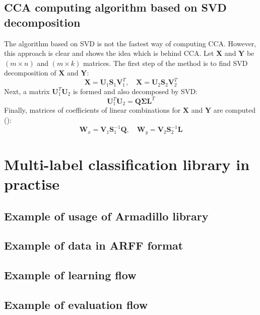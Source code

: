 \begin{appendices}
\newpage
\section{CCA computing algorithm based on SVD decomposition}
\label{app:cca}

The algorithm based on SVD is not the fastest way of computing CCA. However, this approach is clear and shows the idea which is behind CCA. Let $\boldsymbol{X}$ and $\boldsymbol{Y}$ be $(m \times n)$ and $(m \times k)$ matrices. The first step of the method is to find SVD decomposition of $\boldsymbol{X}$ and $\boldsymbol{Y}$:
\begin{equation}
    \boldsymbol{X}=\boldsymbol{U}_1\boldsymbol{S}_1\boldsymbol{V}^T_1, \quad \boldsymbol{X}=\boldsymbol{U}_2\boldsymbol{S}_2\boldsymbol{V}^T_2
\end{equation}
Next, a matrix $\boldsymbol{U}_1^T\boldsymbol{U}_2$ is formed and also decomposed by SVD:
\begin{equation}
    \boldsymbol{U}_1^T\boldsymbol{U}_2 = \boldsymbol{Q}\boldsymbol{\Sigma}{\boldsymbol{L}^T}
\end{equation}
Finally, matrices of coefficients of linear combinations for $\boldsymbol{X}$ and $\boldsymbol{Y}$ are computed (\cite{William}):
\begin{equation}
    \boldsymbol{W}_x=\boldsymbol{V}_1\boldsymbol{S}_1^{-1}\boldsymbol{Q}, \quad  \boldsymbol{W}_y=\boldsymbol{V}_2\boldsymbol{S}_2^{-1}\boldsymbol{L}
\end{equation}


\chapter{Multi-label classification library in practise}
\section{Example of usage of Armadillo library}
\label{app:arma}


\newpage
\section{Example of data in ARFF format}
\label{app:arff}



\newpage
\label{app:learning}
\section{Example of learning flow}


\newpage
\label{app:evaluating}
\section{Example of evaluation flow}


\end{appendices}
